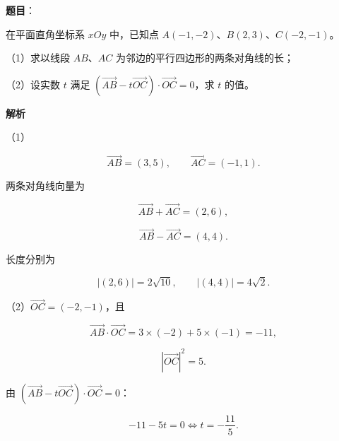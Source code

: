 \begin{answer}

\textbf{题目}：

在平面直角坐标系 $xOy$ 中，已知点 $A(-1,-2)$、$B(2,3)$、$C(-2,-1)$。

（1）求以线段 $AB$、$AC$ 为邻边的平行四边形的两条对角线的长；

（2）设实数 $t$ 满足 $\left(\overrightarrow{AB}-t\overrightarrow{OC}\right)\cdot\overrightarrow{OC}=0$，求 $t$ 的值。

\textbf{解析}

（1）

\nopagebreak[4]
\[\overrightarrow{AB}=(3,5),\qquad \overrightarrow{AC}=(-1,1).\]

两条对角线向量为

\nopagebreak[4]
\[\overrightarrow{AB}+\overrightarrow{AC}=(2,6),\]

\nopagebreak[4]
\[\overrightarrow{AB}-\overrightarrow{AC}=(4,4).\]

长度分别为

\nopagebreak[4]
\[|(2,6)|=2\sqrt{10},\qquad |(4,4)|=4\sqrt2.\]

（2）$\overrightarrow{OC}=(-2,-1)$，且

\nopagebreak[4]
\[\overrightarrow{AB}\cdot\overrightarrow{OC}=3\times(-2)+5\times(-1)=-11,\]

\nopagebreak[4]
\[|\overrightarrow{OC}|^2=5.\]

由 $\left(\overrightarrow{AB}-t\overrightarrow{OC}\right)\cdot\overrightarrow{OC}=0$：

\nopagebreak[4]
\[-11-5t=0\iff t=-\frac{11}5.\]


\end{answer}
